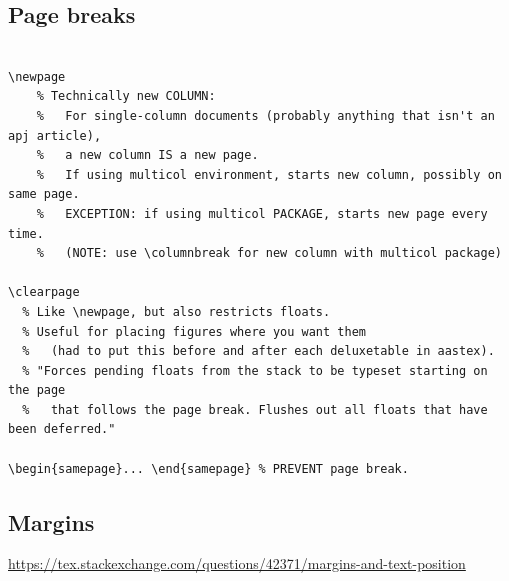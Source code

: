 \documentclass{article}
\begin{document}
\subsection{Page breaks}

\begin{lstlisting}

\newpage
    % Technically new COLUMN:
    %   For single-column documents (probably anything that isn't an apj article),
    %   a new column IS a new page.
    %   If using multicol environment, starts new column, possibly on same page.
    %   EXCEPTION: if using multicol PACKAGE, starts new page every time.
    %   (NOTE: use \columnbreak for new column with multicol package)

\clearpage
  % Like \newpage, but also restricts floats.
  % Useful for placing figures where you want them
  %   (had to put this before and after each deluxetable in aastex).
  % "Forces pending floats from the stack to be typeset starting on the page
  %   that follows the page break. Flushes out all floats that have been deferred."

\begin{samepage}... \end{samepage} % PREVENT page break.

\end{lstlisting}


\subsection{Margins}
\url{https://tex.stackexchange.com/questions/42371/margins-and-text-position}
\end{document}
